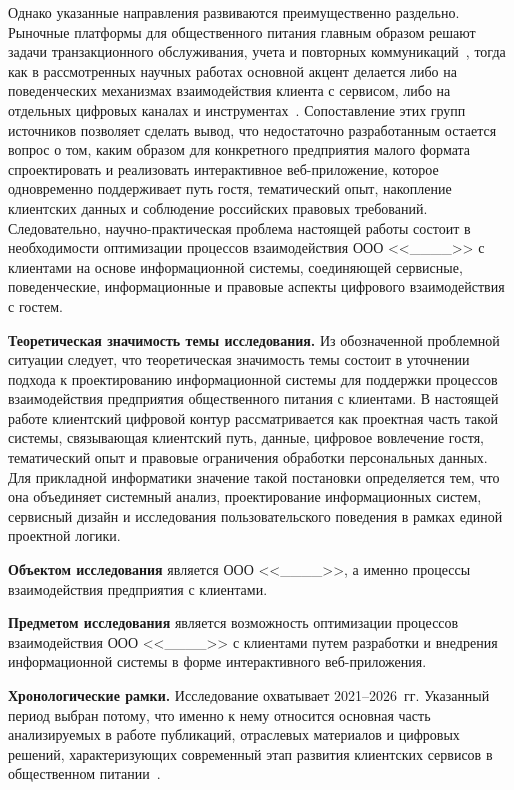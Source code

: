 Однако указанные направления развиваются преимущественно раздельно. Рыночные платформы для общественного питания главным образом решают задачи транзакционного обслуживания, учета и повторных коммуникаций~\cite{iiko_official, rkeeper_official, sevenrooms_guestexperience2026, opentable_grm2026}, тогда как в рассмотренных научных работах основной акцент делается либо на поведенческих механизмах взаимодействия клиента с сервисом, либо на отдельных цифровых каналах и инструментах~\cite{brodie2011, vivek2012, pansari2017, rita2022, londono2024}. Сопоставление этих групп источников позволяет сделать вывод, что недостаточно разработанным остается вопрос о том, каким образом для конкретного предприятия малого формата спроектировать и реализовать интерактивное веб-приложение, которое одновременно поддерживает путь гостя, тематический опыт, накопление клиентских данных и соблюдение российских правовых требований. Следовательно, научно-практическая проблема настоящей работы состоит в необходимости оптимизации процессов взаимодействия ООО <<\_\_\_\_>> с клиентами на основе информационной системы, соединяющей сервисные, поведенческие, информационные и правовые аспекты цифрового взаимодействия с гостем.

\textbf{Теоретическая значимость темы исследования.} Из обозначенной проблемной ситуации следует, что теоретическая значимость темы состоит в уточнении подхода к проектированию информационной системы для поддержки процессов взаимодействия предприятия общественного питания с клиентами. В настоящей работе клиентский цифровой контур рассматривается как проектная часть такой системы, связывающая клиентский путь, данные, цифровое вовлечение гостя, тематический опыт и правовые ограничения обработки персональных данных. Для прикладной информатики значение такой постановки определяется тем, что она объединяет системный анализ, проектирование информационных систем, сервисный дизайн и исследования пользовательского поведения в рамках единой проектной логики.

\textbf{Объектом исследования} является ООО <<\_\_\_\_>>, а именно процессы взаимодействия предприятия с клиентами.

\textbf{Предметом исследования} является возможность оптимизации процессов взаимодействия ООО <<\_\_\_\_>> с клиентами путем разработки и внедрения информационной системы в форме интерактивного веб-приложения.

\textbf{Хронологические рамки.} Исследование охватывает 2021--2026~гг. Указанный период выбран потому, что именно к нему относится основная часть анализируемых в работе публикаций, отраслевых материалов и цифровых решений, характеризующих современный этап развития клиентских сервисов в общественном питании~\cite{chernova2022, ziolkowska2021, smartranking2022, smartranking2024, rita2022, londono2024, thomas2023}.

